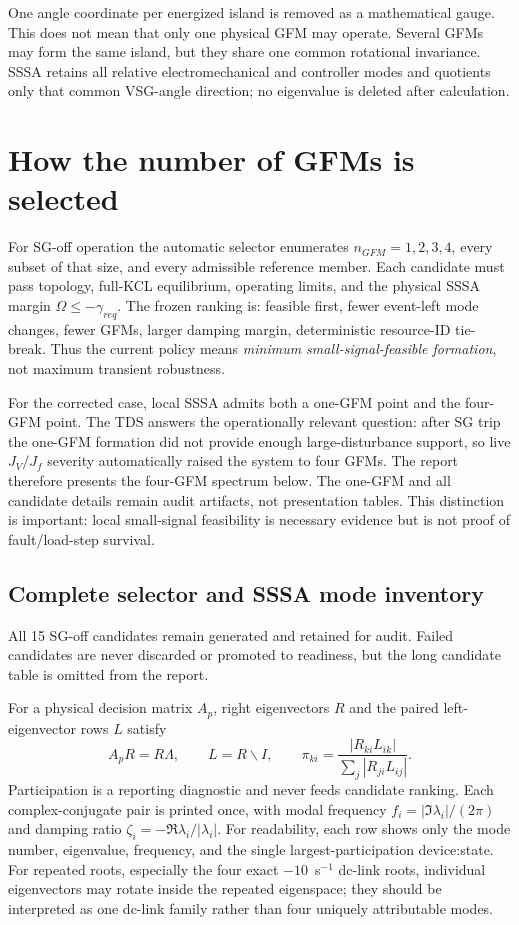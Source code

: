 \documentclass[12pt,a4paper]{article}
\begin{document}
One angle coordinate per energized island is removed as a mathematical gauge. This does not mean
that only one physical GFM may operate. Several GFMs may form the same island, but they share one
common rotational invariance. SSSA retains all relative electromechanical and controller modes and
quotients only that common VSG-angle direction; no eigenvalue is deleted after calculation.

\section{How the number of GFMs is selected}

For SG-off operation the automatic selector enumerates $n_{GFM}=1,2,3,4$, every subset of that
size, and every admissible reference member. Each candidate must pass topology, full-KCL
equilibrium, operating limits, and the physical SSSA margin $\Omega\le-\gamma_{req}$.
The frozen ranking is: feasible first, fewer event-left mode changes, fewer GFMs, larger damping
margin, deterministic resource-ID tie-break. Thus the current policy means
\emph{minimum small-signal-feasible formation}, not maximum transient robustness.

For the corrected case, local SSSA admits both a one-GFM point and the four-GFM point. The TDS
answers the operationally relevant question: after SG trip the one-GFM formation did not provide
enough large-disturbance support, so live $J_V/J_f$ severity automatically raised the system to
four GFMs. The report therefore presents the four-GFM spectrum below. The one-GFM and all
candidate details remain audit artifacts, not presentation tables. This distinction is important:
local small-signal feasibility is necessary evidence but is not proof of fault/load-step survival.

\subsection{Complete selector and SSSA mode inventory}

All 15 SG-off candidates remain generated and retained for audit. Failed candidates are never
discarded or promoted to readiness, but the long candidate table is omitted from the report.

For a physical decision matrix $A_p$, right eigenvectors $R$ and the paired left-eigenvector rows
$L$ satisfy
\begin{equation}
A_pR=R\Lambda,\qquad L=R\backslash I,\qquad
\pi_{ki}=\frac{|R_{ki}L_{ik}|}{\sum_j|R_{ji}L_{ij}|}.
\end{equation}
Participation is a reporting diagnostic and never feeds candidate ranking.
Each complex-conjugate pair is printed once, with modal frequency
$f_i=|\Im\lambda_i|/(2\pi)$ and damping ratio
$\zeta_i=-\Re\lambda_i/|\lambda_i|$. For readability, each row shows only the mode number,
eigenvalue, frequency, and the single largest-participation device:state. For repeated roots,
especially the four exact $-10$~s$^{-1}$ dc-link
roots, individual eigenvectors may rotate inside the repeated eigenspace; they should be
interpreted as one dc-link family rather than four uniquely attributable modes.
\end{document}
